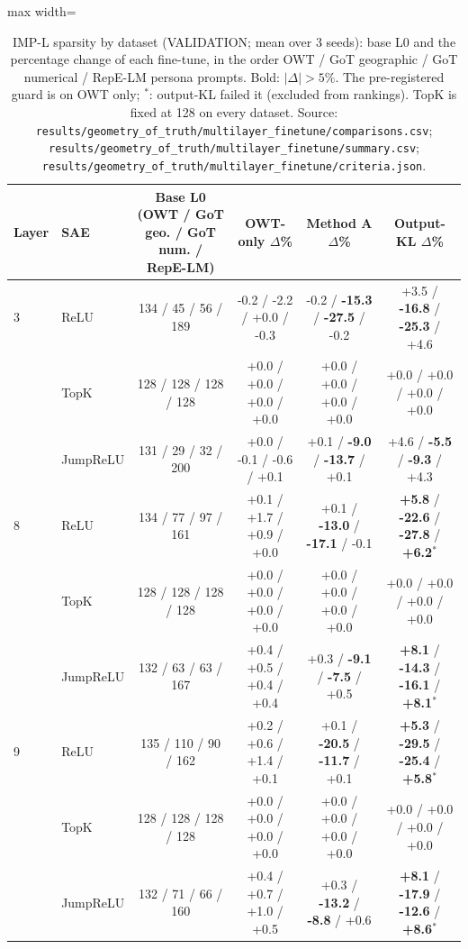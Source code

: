 \begin{table}[t]
\centering
\small
\caption{IMP-L sparsity by dataset (VALIDATION; mean over 3 seeds): base L0 and the percentage change of each fine-tune, in the order OWT / GoT geographic / GoT numerical / RepE-LM persona prompts. Bold: $|\Delta| > 5\%$. The pre-registered guard is on OWT only; $^\ast$: output-KL failed it (excluded from rankings). TopK is fixed at 128 on every dataset. Source: \texttt{results/\allowbreak{}geometry\_of\_truth/\allowbreak{}multilayer\_finetune/\allowbreak{}comparisons.csv}; \texttt{results/\allowbreak{}geometry\_of\_truth/\allowbreak{}multilayer\_finetune/\allowbreak{}summary.csv}; \texttt{results/\allowbreak{}geometry\_of\_truth/\allowbreak{}multilayer\_finetune/\allowbreak{}criteria.json}.}
\label{tab:impl_l0}
\begin{adjustbox}{max width=\linewidth}
\begin{tabular}{llcccc}
\toprule
Layer & SAE & Base L0 (OWT / GoT geo. / GoT num. / RepE-LM) & OWT-only $\Delta$\% & Method A $\Delta$\% & Output-KL $\Delta$\% \\
\midrule
3 & ReLU & 134 / 45 / 56 / 189 & -0.2 / -2.2 / +0.0 / -0.3 & -0.2 / \textbf{-15.3} / \textbf{-27.5} / -0.2 & +3.5 / \textbf{-16.8} / \textbf{-25.3} / +4.6 \\
 & TopK & 128 / 128 / 128 / 128 & +0.0 / +0.0 / +0.0 / +0.0 & +0.0 / +0.0 / +0.0 / +0.0 & +0.0 / +0.0 / +0.0 / +0.0 \\
 & JumpReLU & 131 / 29 / 32 / 200 & +0.0 / -0.1 / -0.6 / +0.1 & +0.1 / \textbf{-9.0} / \textbf{-13.7} / +0.1 & +4.6 / \textbf{-5.5} / \textbf{-9.3} / +4.3 \\
\midrule
8 & ReLU & 134 / 77 / 97 / 161 & +0.1 / +1.7 / +0.9 / +0.0 & +0.1 / \textbf{-13.0} / \textbf{-17.1} / -0.1 & \textbf{+5.8} / \textbf{-22.6} / \textbf{-27.8} / \textbf{+6.2}$^\ast$ \\
 & TopK & 128 / 128 / 128 / 128 & +0.0 / +0.0 / +0.0 / +0.0 & +0.0 / +0.0 / +0.0 / +0.0 & +0.0 / +0.0 / +0.0 / +0.0 \\
 & JumpReLU & 132 / 63 / 63 / 167 & +0.4 / +0.5 / +0.4 / +0.4 & +0.3 / \textbf{-9.1} / \textbf{-7.5} / +0.5 & \textbf{+8.1} / \textbf{-14.3} / \textbf{-16.1} / \textbf{+8.1}$^\ast$ \\
\midrule
9 & ReLU & 135 / 110 / 90 / 162 & +0.2 / +0.6 / +1.4 / +0.1 & +0.1 / \textbf{-20.5} / \textbf{-11.7} / +0.1 & \textbf{+5.3} / \textbf{-29.5} / \textbf{-25.4} / \textbf{+5.8}$^\ast$ \\
 & TopK & 128 / 128 / 128 / 128 & +0.0 / +0.0 / +0.0 / +0.0 & +0.0 / +0.0 / +0.0 / +0.0 & +0.0 / +0.0 / +0.0 / +0.0 \\
 & JumpReLU & 132 / 71 / 66 / 160 & +0.4 / +0.7 / +1.0 / +0.5 & +0.3 / \textbf{-13.2} / \textbf{-8.8} / +0.6 & \textbf{+8.1} / \textbf{-17.9} / \textbf{-12.6} / \textbf{+8.6}$^\ast$ \\
\bottomrule
\end{tabular}
\end{adjustbox}
\end{table}
